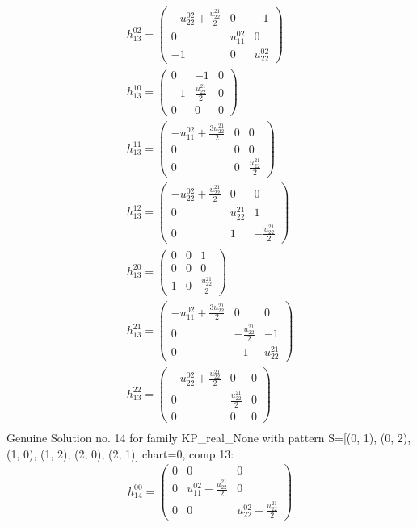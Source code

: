 \documentclass[a4paper, 11pt, twoside, onecolumn]{article}
\begin{document}
\begin{landscape}
\begin{gather*}
	 h_{13}^{02}=\begin{pmatrix}- u^{02}_{22} + \frac{u^{21}_{22}}{2} & 0 & -1\\0 & u^{02}_{11} & 0\\-1 & 0 & u^{02}_{22}\end{pmatrix}\\ 
	 h_{13}^{10}=\begin{pmatrix}0 & -1 & 0\\-1 & \frac{u^{21}_{22}}{2} & 0\\0 & 0 & 0\end{pmatrix}\\ 
	 h_{13}^{11}=\begin{pmatrix}- u^{02}_{11} + \frac{3 u^{21}_{22}}{2} & 0 & 0\\0 & 0 & 0\\0 & 0 & \frac{u^{21}_{22}}{2}\end{pmatrix}\\ 
	 h_{13}^{12}=\begin{pmatrix}- u^{02}_{22} + \frac{u^{21}_{22}}{2} & 0 & 0\\0 & u^{21}_{22} & 1\\0 & 1 & - \frac{u^{21}_{22}}{2}\end{pmatrix}\\ 
	 h_{13}^{20}=\begin{pmatrix}0 & 0 & 1\\0 & 0 & 0\\1 & 0 & \frac{u^{21}_{22}}{2}\end{pmatrix}\\ 
	 h_{13}^{21}=\begin{pmatrix}- u^{02}_{11} + \frac{3 u^{21}_{22}}{2} & 0 & 0\\0 & - \frac{u^{21}_{22}}{2} & -1\\0 & -1 & u^{21}_{22}\end{pmatrix}\\ 
	 h_{13}^{22}=\begin{pmatrix}- u^{02}_{22} + \frac{u^{21}_{22}}{2} & 0 & 0\\0 & \frac{u^{21}_{22}}{2} & 0\\0 & 0 & 0\end{pmatrix}\\ 
\end{gather*} 
Genuine Solution no. 14 for family KP_real_None with pattern S=[(0, 1), (0, 2), (1, 0), (1, 2), (2, 0), (2, 1)] chart=0, comp 13: 
\begin{gather*} 
	 h_{14}^{00}=\begin{pmatrix}0 & 0 & 0\\0 & u^{02}_{11} - \frac{u^{21}_{22}}{2} & 0\\0 & 0 & u^{02}_{22} + \frac{u^{21}_{22}}{2}\end{pmatrix}\\ 

\end{gather*}
\end{landscape}
\end{document}
